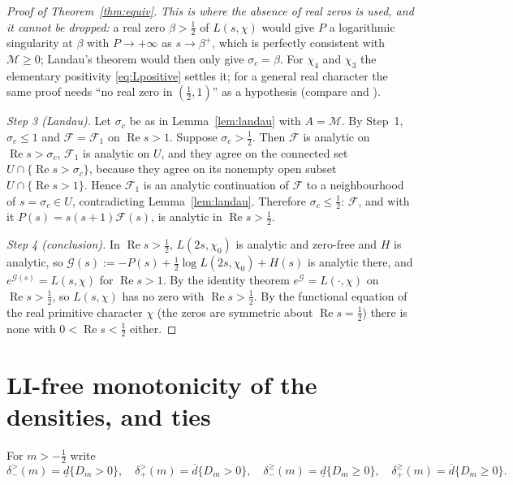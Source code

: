 \documentclass[11pt]{amsart}
\theoremstyle{definition}
\numberwithin{equation}{section}
\newcommand{\re}{\operatorname{Re}}
\newcommand{\cM}{\mathcal M}          %
\newcommand{\dlow}{\underline{d}}
\newcommand{\dup}{\overline{d}}
\begin{document}
\begin{proof}[Proof of Theorem~\ref{thm:equiv}]
\emph{This is where the absence of real zeros is used, and it cannot
be dropped:} a real zero $\beta>\tfrac12$ of $L(s,\chi)$ would give
$P$ a logarithmic singularity at $\beta$ with $P\to+\infty$ as
$s\to\beta^+$, which is perfectly consistent with $\cM\ge0$;
Landau's theorem would then only give $\sigma_c=\beta$. For $\chi_4$
and $\chi_3$ the elementary positivity \eqref{eq:Lpositive} settles
it; for a general real character the same proof needs ``no real zero
in $(\tfrac12,1)$'' as a hypothesis (compare
\cite[the Landau-type converse and the remark on the exceptional-zero caveat]{MC} and \cite[Remark~1]{Zhao25}).

\emph{Step 3 (Landau).} Let $\sigma_c$ be as in
Lemma~\ref{lem:landau} with $A=\cM$. By Step~1, $\sigma_c\le1$ and
$\mathcal F=\mathcal F_1$ on $\re s>1$. Suppose
$\sigma_c>\tfrac12$. Then $\mathcal F$ is analytic on
$\re s>\sigma_c$, $\mathcal F_1$ is analytic on $U$, and they agree
on the connected set $U\cap\{\re s>\sigma_c\}$, because they agree on
its nonempty open subset $U\cap\{\re s>1\}$. Hence $\mathcal F_1$ is
an analytic continuation of $\mathcal F$ to a neighbourhood of
$s=\sigma_c\in U$, contradicting Lemma~\ref{lem:landau}. Therefore
$\sigma_c\le\tfrac12$: $\mathcal F$, and with it
$P(s)=s(s+1)\mathcal F(s)$, is analytic in $\re s>\tfrac12$.

\emph{Step 4 (conclusion).} In $\re s>\tfrac12$, $L(2s,\chi_0)$ is
analytic and zero-free and $H$ is analytic, so
$\mathcal G(s):=-P(s)+\tfrac12\log L(2s,\chi_0)+H(s)$ is analytic
there, and $e^{\mathcal G(s)}=L(s,\chi)$ for $\re s>1$. By the
identity theorem $e^{\mathcal G}=L(\cdot,\chi)$ on $\re s>\tfrac12$,
so $L(s,\chi)$ has no zero with $\re s>\tfrac12$. By the functional
equation of the real primitive character $\chi$ (the zeros are
symmetric about $\re s=\tfrac12$) there is none with
$0<\re s<\tfrac12$ either.
\end{proof}

\section{LI-free monotonicity of the densities, and ties}
\label{sec:ties}

For $m>-\tfrac12$ write
\[
\delta^{>}_{-}(m)=\dlow\{D_m>0\},\quad
\delta^{>}_{+}(m)=\dup\{D_m>0\},\quad
\delta^{\ge}_{-}(m)=\dlow\{D_m\ge0\},\quad
\delta^{\ge}_{+}(m)=\dup\{D_m\ge0\}.
\]
\end{document}

